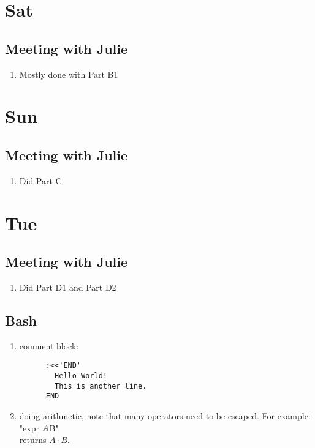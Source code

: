 \documentclass[12pt,letterpaper]{article}
\begin{document}
\section{Sat}
\subsection{Meeting with Julie}
\begin{enumerate}
  \item Mostly done with Part B1
\end{enumerate}


\section{Sun}
\subsection{Meeting with Julie}
\begin{enumerate}
  \item Did Part C
\end{enumerate}

\setcounter{section}{29}
\section{Tue}
\subsection{Meeting with Julie}
\begin{enumerate}
  \item Did Part D1 and Part D2
\end{enumerate}

\subsection{Bash}
\begin{enumerate}
  \item comment block:
    \begin{verbatim}
      :<<'END'
        Hello World!
        This is another line.
      END
    \end{verbatim}

  \item doing arithmetic, note that many operators need to be escaped. For example:\\
    "expr $A \* $B"\\
    returns $A\cdot B$.
\end{enumerate}
\end{document}
